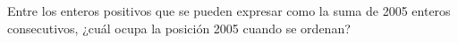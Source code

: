 Entre los enteros positivos que se pueden expresar como la suma de 2005 enteros consecutivos, ¿cuál ocupa la posición 2005 cuando se ordenan?
